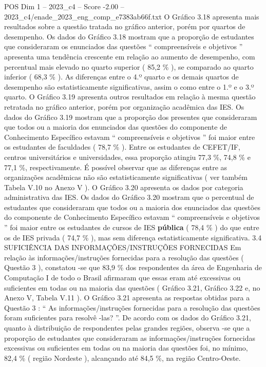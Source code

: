 \begin{textsample}{POS Dim 1 – 2023\_c4 – Score -2.00 – 2023\_c4/enade\_2023\_eng\_comp\_e7383ab66f.txt}
O Gráfico 3.18 apresenta mais resultados sobre a questão tratada no gráfico anterior, porém por quartos de desempenho.
Os dados do Gráfico 3.18 mostram que a proporção de estudantes que consideraram os enunciados das questões “ compreensíveis e objetivos ” apresenta uma tendência crescente em relação ao aumento de desempenho, com percentual mais elevado no quarto superior ( 85,2 \% ), se comparado ao quarto inferior ( 68,3 \% ).
As diferenças entre o 4.º quarto e os demais quartos de desempenho são estatisticamente significativas, assim o como entre o 1.º e o 3.º quarto.
O Gráfico 3.19 apresenta outros resultados em relação à mesma questão retratada no gráfico anterior, porém por organização acadêmica das IES.
Os dados do Gráfico 3.19 mostram que a proporção dos presentes que consideraram que todos ou a maioria dos enunciados das questões do componente de Conhecimento Específico estavam “ compreensíveis e objetivos ” foi maior entre os estudantes de faculdades ( 78,7 \% ).
Entre os estudantes de CEFET/IF, centros universitários e universidades, essa proporção atingiu 77,3 \%, 74,8 \% e 77,1 \%, respectivamente.
É possível observar que as diferenças entre as organizações acadêmicas não são estatisticamente significativas ( ver também Tabela V.10 no Anexo V ).
O Gráfico 3.20 apresenta os dados por categoria administrativa das IES.
Os dados do Gráfico 3.20 mostram que o percentual de estudantes que consideraram que todos ou a maioria dos enunciados das questões do componente de Conhecimento Específico estavam “ compreensíveis e objetivos ” foi maior entre os estudantes de cursos de IES \textbf{pública} ( 78,4 \% ) do que entre os de IES privada ( 74,7 \% ), mas sem diferença estatisticamente significativa. 3.4 SUFICIÊNCIA DAS INFORMAÇÕES/INSTRUÇÕES FORNECIDAS Em relação às informações/instruções fornecidas para a resolução das questões ( Questão 3 ), constatou -se que 83,9 \% dos respondentes da área de Engenharia de Computação I de todo o Brasil afirmaram que essas eram até excessivas ou suficientes em todas ou na maioria das questões ( Gráfico 3.21, Gráfico 3.22 e, no Anexo V, Tabela V.11 ).
O Gráfico 3.21 apresenta as respostas obtidas para a Questão 3 : “ As informações/instruções fornecidas para a resolução das questões foram suficientes para resolvê -las? ”.
De acordo com os dados do Gráfico 3.21, quanto à distribuição de respondentes pelas grandes regiões, observa -se que a proporção de estudantes que consideraram as informações/instruções fornecidas excessivas ou suficientes em todas ou na maioria das questões foi, no mínimo, 82,4 \% ( região Nordeste ), alcançando até 84,5 \%, na região Centro-Oeste.

\end{textsample}
